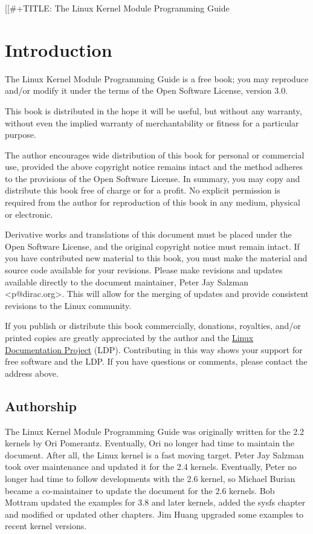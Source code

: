 \documentclass[11pt]{article}
\author{Peter Jay Salzman, Michael Burian, Ori Pomerantz, Bob Mottram, Jim Huang}
\date{\today}
\title{}
\begin{document}
\tableofcontents

[[\#+TITLE: The Linux Kernel Module Programming Guide


\section{Introduction}
\label{sec:org328f51b}
The Linux Kernel Module Programming Guide is a free book; you may reproduce and/or modify it under the terms of the Open Software License, version 3.0.

This book is distributed in the hope it will be useful, but without any warranty, without even the implied warranty of merchantability or fitness for a particular purpose.

The author encourages wide distribution of this book for personal or commercial use, provided the above copyright notice remains intact and the method adheres to the provisions of the Open Software License. In summary, you may copy and distribute this book free of charge or for a profit. No explicit permission is required from the author for reproduction of this book in any medium, physical or electronic.

Derivative works and translations of this document must be placed under the Open Software License, and the original copyright notice must remain intact. If you have contributed new material to this book, you must make the material and source code available for your revisions. Please make revisions and updates available directly to the document maintainer, Peter Jay Salzman <p@dirac.org>. This will allow for the merging of updates and provide consistent revisions to the Linux community.

If you publish or distribute this book commercially, donations, royalties, and/or printed copies are greatly appreciated by the author and the \href{http://www.tldp.org}{Linux Documentation Project} (LDP). Contributing in this way shows your support for free software and the LDP. If you have questions or comments, please contact the address above.

\subsection{Authorship}
\label{sec:org10b3311}

The Linux Kernel Module Programming Guide was originally written for the 2.2 kernels by Ori Pomerantz. Eventually, Ori no longer had time to maintain the document. After all, the Linux kernel is a fast moving target. Peter Jay Salzman took over maintenance and updated it for the 2.4 kernels. Eventually, Peter no longer had time to follow developments with the 2.6 kernel, so Michael Burian became a co-maintainer to update the document for the 2.6 kernels.  Bob Mottram updated the examples for 3.8 and later kernels, added the sysfs chapter and modified or updated other chapters. Jim Huang upgraded some examples to recent kernel versions.
\end{document}
